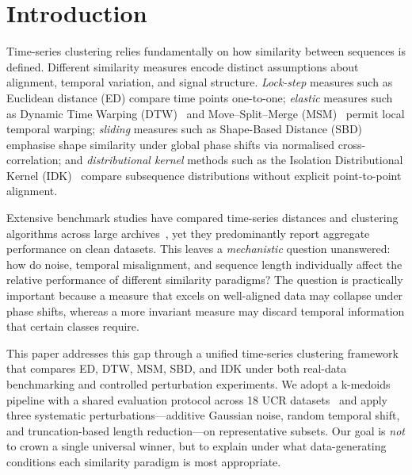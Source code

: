 
\section{Introduction}\label{sec:introduction}

Time-series clustering relies fundamentally on how similarity between sequences is defined.
Different similarity measures encode distinct assumptions about alignment, temporal variation, and signal structure.
\emph{Lock-step} measures such as Euclidean distance (ED) compare time points one-to-one;
\emph{elastic} measures such as Dynamic Time Warping (DTW)~\cite{berndt1994dtw} and Move--Split--Merge (MSM)~\cite{stefan2013msm} permit local temporal warping;
\emph{sliding} measures such as Shape-Based Distance (SBD)~\cite{paparrizos2015kshape} emphasise shape similarity under global phase shifts via normalised cross-correlation;
and \emph{distributional kernel} methods such as the Isolation Distributional Kernel (IDK)~\cite{ting2022idk} compare subsequence distributions without explicit point-to-point alignment.

Extensive benchmark studies have compared time-series distances and clustering algorithms across large archives~\cite{paparrizos2025tscbenchmark,javed2020benchmark}, yet they predominantly report aggregate performance on clean datasets.
This leaves a \emph{mechanistic} question unanswered: how do noise, temporal misalignment, and sequence length individually affect the relative performance of different similarity paradigms?
The question is practically important because a measure that excels on well-aligned data may collapse under phase shifts, whereas a more invariant measure may discard temporal information that certain classes require.

This paper addresses this gap through a unified time-series clustering framework that compares ED, DTW, MSM, SBD, and IDK under both real-data benchmarking and controlled perturbation experiments.
We adopt a k-medoids pipeline with a shared evaluation protocol across 18 UCR datasets~\cite{bagnall2017bakeoff} and apply three systematic perturbations---additive Gaussian noise, random temporal shift, and truncation-based length reduction---on representative subsets.
Our goal is \emph{not} to crown a single universal winner, but to explain under what data-generating conditions each similarity paradigm is most appropriate.

